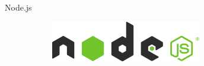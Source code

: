 \begin{frame}{Node.js}
  \begin{figure}[htb]
    \centering
    \begin{subfigure}[b]{0.33\textwidth}
      \includegraphics[width=\linewidth, keepaspectratio]{./resources/nodejs-light.png}
      \nocite{nodejs:logo}
      \vspace{10mm}
    \end{subfigure}%
    \begin{subfigure}[b]{0.33\textwidth}
      \nocite{google:v8:logo}
    \end{subfigure}%
    \begin{subfigure}[b]{0.33\textwidth}
      \nocite{npm:logo}
      \vspace{5mm}
    \end{subfigure}%
  \end{figure}

\end{frame}

